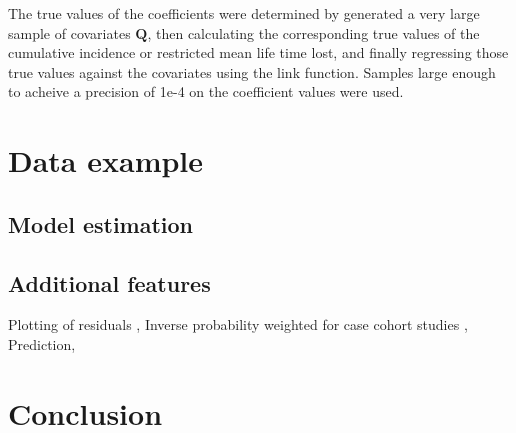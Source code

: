 \documentclass[
]{article}
\begin{document}
The true values of the coefficients were determined by generated a very
large sample of covariates \(\mathbf{Q}\), then calculating the
corresponding true values of the cumulative incidence or restricted mean
life time lost, and finally regressing those true values against the
covariates using the link function. Samples large enough to acheive a
precision of 1e-4 on the coefficient values were used.

\hypertarget{data-example}{%
\section{Data example}\label{data-example}}

\hypertarget{model-estimation}{%
\subsection{Model estimation}\label{model-estimation}}

\hypertarget{additional-features}{%
\subsection{Additional features}\label{additional-features}}

Plotting of residuals \citet{perme2008checking}, Inverse probability
weighted for case cohort studies \citet{parner2020cumulative},
Prediction,

\hypertarget{conclusion}{%
\section{Conclusion}\label{conclusion}}

\renewcommand\refname{References}
  
\end{document}

